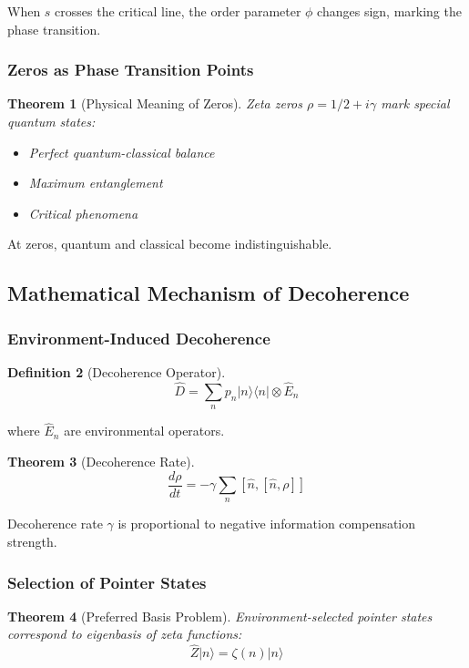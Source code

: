 \documentclass[11pt]{article}
\theoremstyle{plain}
\newtheorem{theorem}{Theorem}[section]
\theoremstyle{definition}
\newtheorem{definition}[theorem]{Definition}
\theoremstyle{remark}
\begin{document}
When $s$ crosses the critical line, the order parameter $\phi$ changes sign, marking the phase transition.

\subsubsection{Zeros as Phase Transition Points}

\begin{theorem}[Physical Meaning of Zeros]
Zeta zeros $\rho = 1/2 + i\gamma$ mark special quantum states:
\begin{itemize}
\item Perfect quantum-classical balance
\item Maximum entanglement
\item Critical phenomena
\end{itemize}
\end{theorem}

At zeros, quantum and classical become indistinguishable.

\subsection{Mathematical Mechanism of Decoherence}

\subsubsection{Environment-Induced Decoherence}

\begin{definition}[Decoherence Operator]
$$\hat{D} = \sum_{n} p_n |n\rangle\langle n| \otimes \hat{E}_n$$
\end{definition}

where $\hat{E}_n$ are environmental operators.

\begin{theorem}[Decoherence Rate]
$$\frac{d\rho}{dt} = -\gamma \sum_{n} [\hat{n}, [\hat{n}, \rho]]$$
\end{theorem}

Decoherence rate $\gamma$ is proportional to negative information compensation strength.

\subsubsection{Selection of Pointer States}

\begin{theorem}[Preferred Basis Problem]
Environment-selected pointer states correspond to eigenbasis of zeta functions:
$$\hat{Z}|n\rangle = \zeta(n)|n\rangle$$
\end{theorem}
\end{document}
